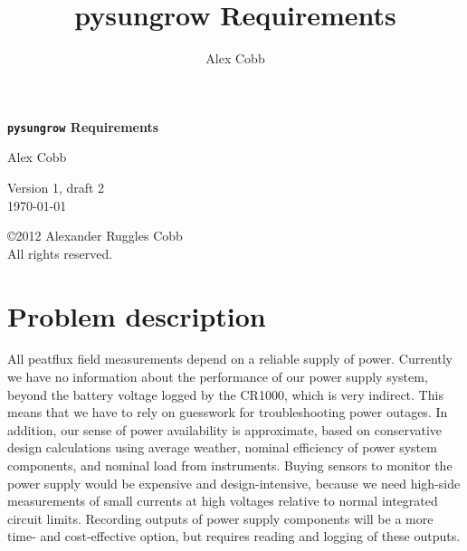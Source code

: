 \documentclass[pdftex,oneside,12pt,a4paper]{book}
\begin{document}
\title{pysungrow Requirements}
\author{Alex Cobb}

\frontmatter


\thispagestyle{empty}


\noindent
{\center\Huge\bfseries
  \texttt{pysungrow} Requirements \\
}


{\center\large
  \noindent
  {\Large
  Alex Cobb \\
  }

  \vspace{4ex}

  \noindent
  {\normalsize
  Version 1, draft 2 \\
  \today \\ }
}

\pagebreak

\thispagestyle{empty}

\vspace*{0.33\textheight}
\hspace{3em}
\parbox{30em}{%
\begin{small}
  \noindent
  \copyright 2012 Alexander Ruggles Cobb \\
  All rights reserved.
\end{small}
}

\tableofcontents

\mainmatter

\chapter{Problem description}
All peatflux field measurements depend on a reliable supply of power.  Currently we have no information about the performance of our power supply system, beyond the battery voltage logged by the CR1000, which is very indirect.  This means that we have to rely on guesswork for troubleshooting power outages. In addition, our sense of power availability is approximate, based on conservative design calculations using average weather, nominal efficiency of power system components, and nominal load from instruments. Buying sensors to monitor the power supply would be expensive and design-intensive, because we need high-side measurements of small currents at high voltages relative to normal integrated circuit limits.  Recording outputs of power supply components will be a more time- and cost-effective option, but requires reading and logging of these outputs.
\end{document}
